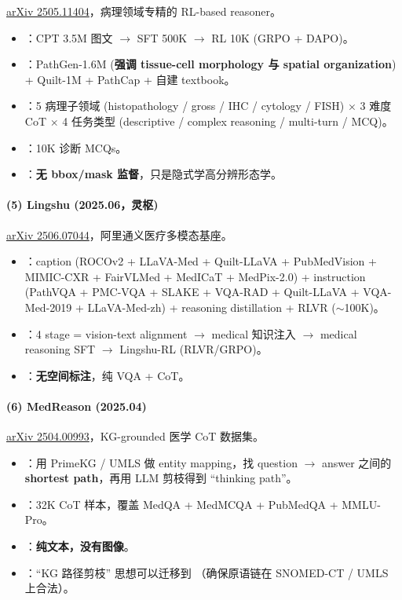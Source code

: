 \href{https://arxiv.org/abs/2505.11404}{arXiv 2505.11404}，病理领域专精的 RL-based reasoner。

\begin{itemize}[leftmargin=1.5em]
  \item {}：CPT 3.5M 图文 $\to$ SFT 500K $\to$ RL 10K (GRPO + DAPO)。
  \item {}：PathGen-1.6M (\textbf{强调 tissue-cell morphology 与 spatial organization}) + Quilt-1M + PathCap + 自建 textbook。
  \item {}：5 病理子领域 (histopathology / gross / IHC / cytology / FISH) $\times$ 3 难度 CoT $\times$ 4 任务类型 (descriptive / complex reasoning / multi-turn / MCQ)。
  \item {}：10K 诊断 MCQs。
  \item {}：\textbf{无 bbox/mask 监督}，只是隐式学高分辨形态学。
\end{itemize}

\paragraph{(5) Lingshu (2025.06，灵枢)}

\href{https://arxiv.org/abs/2506.07044}{arXiv 2506.07044}，阿里通义医疗多模态基座。

\begin{itemize}[leftmargin=1.5em]
  \item {}：caption (ROCOv2 + LLaVA-Med + Quilt-LLaVA + PubMedVision + MIMIC-CXR + FairVLMed + MedICaT + MedPix-2.0) + instruction (PathVQA + PMC-VQA + SLAKE + VQA-RAD + Quilt-LLaVA + VQA-Med-2019 + LLaVA-Med-zh) + reasoning distillation + RLVR ($\sim$100K)。
  \item {}：4 stage = vision-text alignment $\to$ medical 知识注入 $\to$ medical reasoning SFT $\to$ Lingshu-RL (RLVR/GRPO)。
  \item {}：\textbf{无空间标注}，纯 VQA + CoT。
\end{itemize}

\paragraph{(6) MedReason (2025.04)}

\href{https://arxiv.org/abs/2504.00993}{arXiv 2504.00993}，KG-grounded 医学 CoT 数据集。

\begin{itemize}[leftmargin=1.5em]
  \item {}：用 PrimeKG / UMLS 做 entity mapping，找 question $\to$ answer 之间的 \textbf{shortest path}，再用 LLM 剪枝得到 ``thinking path''。
  \item {}：32K CoT 样本，覆盖 MedQA + MedMCQA + PubMedQA + MMLU-Pro。
  \item {}：\textbf{纯文本，没有图像}。
  \item {}：``KG 路径剪枝'' 思想可以迁移到 （确保原语链在 SNOMED-CT / UMLS 上合法）。
\end{itemize}

